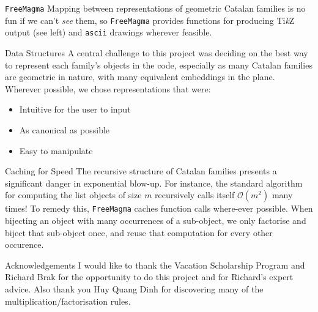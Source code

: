 \documentclass[final]{beamer}
\newlength{\colwidth}
\begin{document}
\begin{frame}[t]
\begin{columns}[t]
\begin{column}{\colwidth}
\begin{alertblock}{\texttt{FreeMagma}}
    Mapping between representations of geometric Catalan families is no fun if we can't \textit{see} them, so \texttt{FreeMagma} provides functions for producing Ti\textit{k}Z output (see left) and \texttt{ascii} drawings wherever feasible.
  \end{alertblock}
  \begin{block}{Data Structures}
    A central challenge to this project was deciding on the best way to represent each family's objects in the code, especially as many Catalan families are geometric in nature, with many equivalent embeddings in the plane. Wherever possible, we chose representations that were:
    \begin{itemize}
      \item Intuitive for the user to input
      \item As canonical as possible
      \item Easy to manipulate 
    \end{itemize}
  \end{block}
  \begin{block}{Caching for Speed}
    The recursive structure of Catalan families presents a significant danger in exponential blow-up. For instance, the standard algorithm for computing the list objects of size $m$ recursively calls itself $\mathcal{O}(m^2)$ many times! To remedy this, \texttt{FreeMagma} caches function calls where-ever possible. When bijecting an object with many occurrences of a sub-object, we only factorise and biject that sub-object once, and reuse that computation for every other occurence. 
  \end{block}

    


  \begin{block}{Acknowledgements}
    I would like to thank the Vacation Scholarship Program and Richard Brak for the opportunity to do this project and for Richard's expert advice. Also thank you Huy Quang Dinh for discovering many of the multiplication/factorisation rules.
  \end{block}
  

\end{column}
\end{columns}
\end{frame}
\end{document}
